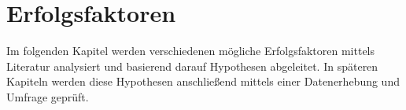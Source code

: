 \chapter{Erfolgsfaktoren}



Im folgenden Kapitel werden verschiedenen mögliche Erfolgsfaktoren mittels Literatur analysiert und
basierend darauf Hypothesen abgeleitet. In späteren Kapiteln werden diese Hypothesen anschließend
mittels einer Datenerhebung und Umfrage geprüft.





\newpage


\newpage


\newpage


\newpage









% 

